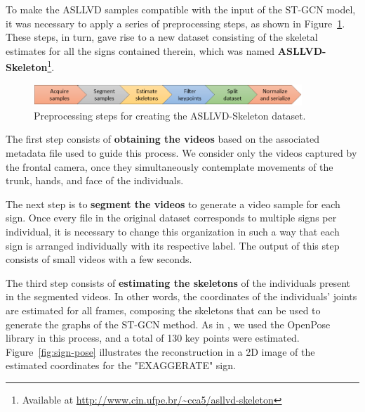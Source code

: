 To make the ASLLVD samples compatible with the input of the ST-GCN model, it was necessary to apply a series of preprocessing steps, as shown in Figure~\ref{fig:preprocessamento}. These steps, in turn, gave rise to a new dataset consisting of the skeletal estimates for all the signs contained therein, which was named \textbf{ASLLVD-Skeleton}\footnote{
   Available at \url{http://www.cin.ufpe.br/~cca5/asllvd-skeleton}
}. 

\begin{figure}[ht!]
    \centering
    \includegraphics[width=0.9\textwidth]{images/dataset_preprocessing_en}
    \caption{Preprocessing steps for creating the ASLLVD-Skeleton dataset.}
    \label{fig:preprocessamento}
\end{figure}


The first step consists of \textbf{obtaining the videos} based on the associated metadata file used to guide this process. We consider only the videos captured by the frontal camera, once they simultaneously contemplate movements of the trunk, hands, and face of the individuals.

The next step is to \textbf{segment the videos} to generate a video sample for each sign. Once every file in the original dataset corresponds to multiple signs per individual, it is necessary to change this organization in such a way that each sign is arranged individually with its respective label. %
The output of this step consists of small videos with a few seconds. %


The third step consists of \textbf{estimating the skeletons} of the individuals present in the segmented videos. In other words, the coordinates of the individuals' joints are estimated for all frames, composing the skeletons that can be used to generate the graphs of the ST-GCN method. As in \cite {st-gcn-2018}, we used the OpenPose library in this process, and a total of 130 key points were estimated. Figure~\ref{fig:sign-pose} illustrates the reconstruction in a 2D image of the estimated coordinates for the "EXAGGERATE" sign. 

